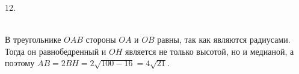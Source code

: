 12. \begin{figure}[ht!]
\end{figure}\\
В треугольнике $OAB$ стороны $OA$ и $OB$ равны, так как являются радиусами. Тогда он равнобедренный и $OH$ является не только высотой, но и медианой, а поэтому $AB=2BH=2\sqrt{100-16}=4\sqrt{21}.$\\
